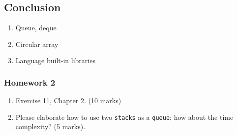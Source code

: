 \documentclass[aspectratio=169, 14pt]{beamer}
\begin{document}
\begin{frame}
\section{\textcolor{darkmidnightblue}{Conclusion}}
    \begin{enumerate}
        \item Queue, deque
        \item Circular array
        \item Language built-in libraries
    \end{enumerate}
\end{frame}
\begin{frame}
    \frametitle{Homework 2}
\begin{enumerate}
    \item Exercise 11, Chapter 2. (10 marks)
    \item Please elaborate how to use two \texttt{stacks} as a \texttt{queue}; how about the time complexity?  (5 marks).
\end{enumerate}
\end{frame}
\end{document}
